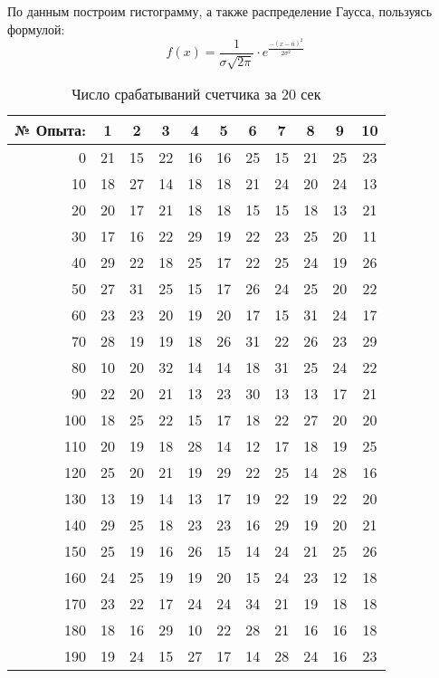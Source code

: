 \documentclass[a4paper, 12pt]{article}
\begin{document}
По данным построим гистограмму, а также распределение Гаусса, пользуясь формулой:\\
\begin{equation}
	f(x) = \frac{1}{\sigma \sqrt{2\pi}} \cdot e^{ \frac{ -(x - \overline{n})^2 } { 2\sigma^{2} } }
\end{equation} 

\begin{table}[H]
	\centering
	\begin{tabular}{|r|c|c|c|c|c|c|c|c|c|c|}
		\hline
		№ Опыта: & 1 & 2 & 3 & 4 & 5 & 6 & 7 & 8 & 9 & 10     \\ \hline
		
		0   & 21 & 15 & 22 & 16 & 16 & 25 & 15 & 21 & 25 & 23 \\ \hline
		10  & 18 & 27 & 14 & 18 & 18 & 21 & 24 & 20 & 24 & 13 \\ \hline
		20  & 20 & 17 & 21 & 18 & 18 & 15 & 15 & 18 & 13 & 21 \\ \hline
		30  & 17 & 16 & 22 & 29 & 19 & 22 & 23 & 25 & 20 & 11 \\ \hline
		40  & 29 & 22 & 18 & 25 & 17 & 22 & 25 & 24 & 19 & 26 \\ \hline
		50  & 27 & 31 & 25 & 15 & 17 & 26 & 24 & 25 & 20 & 22 \\ \hline
		60  & 23 & 23 & 20 & 19 & 20 & 17 & 15 & 31 & 24 & 17 \\ \hline
		70  & 28 & 19 & 19 & 18 & 26 & 31 & 22 & 26 & 23 & 29 \\ \hline
		80  & 10 & 20 & 32 & 14 & 14 & 18 & 31 & 25 & 24 & 22 \\ \hline
		90  & 22 & 20 & 21 & 13 & 23 & 30 & 13 & 13 & 17 & 21 \\ \hline
		100 & 18 & 25 & 22 & 15 & 17 & 18 & 22 & 27 & 20 & 20 \\ \hline
		110 & 20 & 19 & 18 & 28 & 14 & 12 & 17 & 18 & 19 & 25 \\ \hline
		120 & 25 & 20 & 21 & 19 & 29 & 22 & 25 & 14 & 28 & 16 \\ \hline
		130 & 13 & 19 & 14 & 13 & 17 & 19 & 22 & 19 & 22 & 20 \\ \hline
		140 & 29 & 25 & 18 & 23 & 23 & 16 & 29 & 19 & 20 & 21 \\ \hline
		150 & 25 & 19 & 16 & 26 & 15 & 14 & 24 & 21 & 25 & 26 \\ \hline
		160 & 24 & 25 & 19 & 19 & 20 & 15 & 24 & 23 & 12 & 18 \\ \hline
		170 & 23 & 22 & 17 & 24 & 24 & 34 & 21 & 19 & 18 & 18 \\ \hline
		180 & 18 & 16 & 29 & 10 & 22 & 28 & 21 & 16 & 16 & 18 \\ \hline
		190 & 19 & 24 & 15 & 27 & 17 & 14 & 28 & 24 & 16 & 23 \\ \hline
	\end{tabular}
	\caption{Число срабатываний счетчика за 20 сек}
\end{table}
\end{document}
